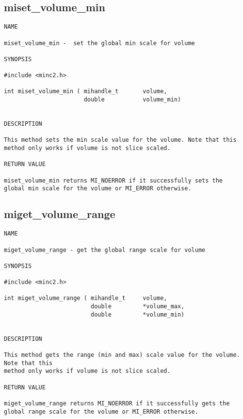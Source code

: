 \documentclass{article}
\begin{document}
\subsection{miset\_volume\_min}
\begin{verbatim}
NAME

miset_volume_min -  set the global min scale for volume

SYNOPSIS

#include <minc2.h>

int miset_volume_min ( mihandle_t       volume,
                       double           volume_min)


DESCRIPTION

This method sets the min scale value for the volume. Note that this 
method only works if volume is not slice scaled.

RETURN VALUE

miset_volume_min returns MI_NOERROR if it successfully sets the
global min scale for the volume or MI_ERROR otherwise.
\end{verbatim}

\subsection{miget\_volume\_range}
\begin{verbatim}
NAME

miget_volume_range - get the global range scale for volume

SYNOPSIS

#include <minc2.h>

int miget_volume_range ( mihandle_t     volume,
                         double         *volume_max,
                         double         *volume_min)


DESCRIPTION

This method gets the range (min and max) scale value for the volume. Note that this 
method only works if volume is not slice scaled.

RETURN VALUE

miget_volume_range returns MI_NOERROR if it successfully gets the
global range scale for the volume or MI_ERROR otherwise. 
\end{verbatim}
\end{document}

